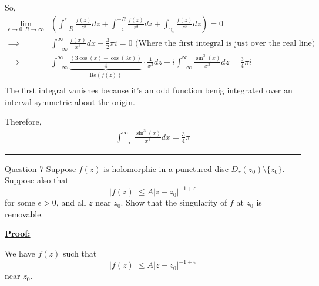 \documentclass{article}
\begin{document}
So,
\begin{align*}
  \lim_{\epsilon \rightarrow 0, R \rightarrow \infty}& \left(\int_{-R}^{\epsilon} \frac{f(z)}{z^3} dz + \int_{+\epsilon}^{+R} \frac{f(z)}{z^3} dz + \int_{{\gamma_{\epsilon}}} \frac{f(z)}{z^3} dz \right) = 0 \\
  \implies & \int_{-\infty}^{\infty} \frac{f(x)}{x^3} dx - \frac{3}{2}\pi i = 0 \text{  (Where the first integral is just over the real line)} \\
  \implies & \int_{-\infty}^{\infty} \underbrace{\frac{\left(3\cos(x)-\cos(3x)\right)}{4}}_{\text{Re}(f(z))} \cdot \frac{1}{x^3} dz + i\int_{-\infty}^{\infty} \frac{\sin^3(x)}{x^3}  dz = \frac{3}{4}\pi i \\
\end{align*}
The first integral vanishes because it's an odd function benig integrated over an interval symmetric about the origin.

\vskip 0.5cm
Therefore, 
\begin{align*}
  \boxed{\int_{-\infty}^{\infty} \frac{\sin^3(x)}{x^3} dx = \frac{3}{4} \pi }
\end{align*}

\vskip 0.5cm
\hrule 
\vskip 0.5cm



\begin{mathdefinitionbox}{Question 7}
\vskip 0.5cm
Suppose $f(z)$ is holomorphic in a punctured disc $D_r(z_0) \setminus \{z_0\}$. Suppose also that 
\[ \left| f(z) \right| \leq A \left| z - z_0 \right|^{-1+\epsilon} \] for some $\epsilon > 0$, and all $z$ near $z_0$. Show that the singularity of $f$ at $z_0$ is removable.
\end{mathdefinitionbox}

\vskip 0.5cm
\underline{\textbf{Proof:}}

We have $f(z)$ such that 
\[ \left|f(z)\right| \leq A \left|z-z_0\right|^{-1+\epsilon} \] near $z_0$.




\end{document}
